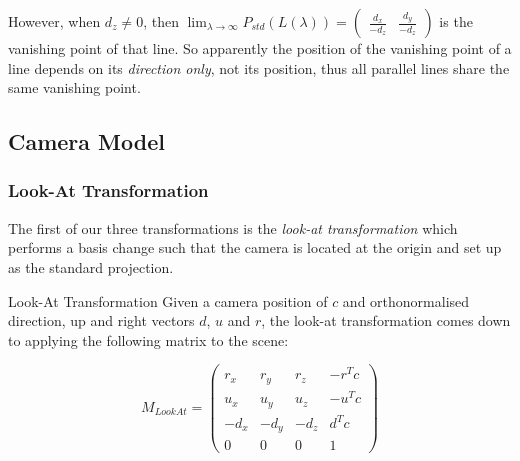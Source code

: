 \documentclass[english]{panikzettel}
\begin{document}
However, when $d_z \neq 0$, then $\lim_{\lambda \to \infty} P_{std} (L(\lambda)) = \begin{pmatrix} \frac{d_x}{-d_z} & \frac{d_y}{-d_z}\end{pmatrix}$ is the vanishing point of that line. So apparently the position of the vanishing point of a line depends on its \emph{direction only}, not its position, thus all parallel lines share the same vanishing point.


\begin{halfboxl}
\vspace{-\baselineskip}
\subsection{Camera Model}

\subsubsection*{Look-At Transformation}

The first of our three transformations is the \emph{look-at transformation} which performs a basis change such that the camera is located at the origin and set up as the standard projection.
\end{halfboxl}%
\begin{halfboxr}
\vspace{-\baselineskip}
\begin{defi}{Look-At Transformation}
Given a camera position of $c$ and orthonormalised direction, up and right vectors $d$, $u$ and $r$, the look-at transformation comes down to applying the following matrix to the scene:

$$M_{LookAt} = \begin{pmatrix}
r_x & r_y & r_z & -r^Tc \\
u_x & u_y & u_z & -u^Tc \\
-d_x & -d_y & -d_z & d^Tc \\
0 & 0 & 0 & 1
\end{pmatrix}$$

\end{defi}
\end{halfboxr}
\end{document}
